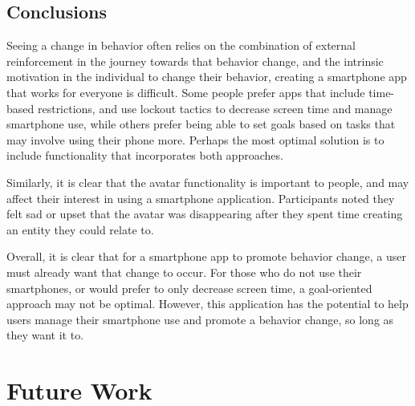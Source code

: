 \documentclass[12pt, title page, manuscript, nonacm]{acmart}
\begin{document}
\subsection*{Conclusions}
Seeing a change in behavior often relies on the combination of external reinforcement in the journey towards that behavior change, and the intrinsic motivation in the individual to change their behavior, creating a smartphone app that works for everyone is difficult. Some people prefer apps that include time-based restrictions, and use lockout tactics to decrease screen time and manage smartphone use, while others prefer being able to set goals based on tasks that may involve using their phone more. Perhaps the most optimal solution is to include functionality that incorporates both approaches.
\par Similarly, it is clear that the avatar functionality is important to people, and may affect their interest in using a smartphone application. Participants noted they felt sad or upset that the avatar was disappearing after they spent time creating an entity they could relate to.
\par Overall, it is clear that for a smartphone app to promote behavior change, a user must already want that change to occur. For those who do not use their smartphones, or would prefer to only decrease screen time, a goal-oriented approach may not be optimal. However, this application has the potential to help users manage their smartphone use and promote a behavior change, so long as they want it to.
\section*{Future Work}
\end{document}
